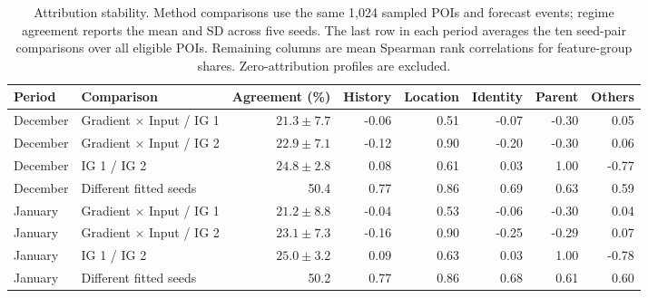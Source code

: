 \begin{table}[!htbp]
\centering
\begingroup
\singlespacing
\fontsize{9pt}{10.5pt}\selectfont
\setlength{\tabcolsep}{4pt}
\renewcommand{\arraystretch}{1.08}
\caption{Attribution stability. Method comparisons use the same 1,024 sampled POIs and forecast events; regime agreement reports the mean and SD across five seeds. The last row in each period averages the ten seed-pair comparisons over all eligible POIs. Remaining columns are mean Spearman rank correlations for feature-group shares. Zero-attribution profiles are excluded.}
\label{tab:attribution_stability}
\begin{adjustbox}{max width=\linewidth}
\begin{tabular}{llrrrrrr}
\toprule
Period & Comparison & Agreement (\%) & History & Location & Identity & Parent & Others \\
\midrule
December & Gradient $\times$ Input / IG 1 & $21.3\pm 7.7$ & -0.06 & 0.51 & -0.07 & -0.30 & 0.05 \\
December & Gradient $\times$ Input / IG 2 & $22.9\pm 7.1$ & -0.12 & 0.90 & -0.20 & -0.30 & 0.06 \\
December & IG 1 / IG 2 & $24.8\pm 2.8$ & 0.08 & 0.61 & 0.03 & 1.00 & -0.77 \\
December & Different fitted seeds & 50.4 & 0.77 & 0.86 & 0.69 & 0.63 & 0.59 \\
January & Gradient $\times$ Input / IG 1 & $21.2\pm 8.8$ & -0.04 & 0.53 & -0.06 & -0.30 & 0.04 \\
January & Gradient $\times$ Input / IG 2 & $23.1\pm 7.3$ & -0.16 & 0.90 & -0.25 & -0.29 & 0.07 \\
January & IG 1 / IG 2 & $25.0\pm 3.2$ & 0.09 & 0.63 & 0.03 & 1.00 & -0.78 \\
January & Different fitted seeds & 50.2 & 0.77 & 0.86 & 0.68 & 0.61 & 0.60 \\
\bottomrule
\end{tabular}
\end{adjustbox}
\endgroup
\end{table}

